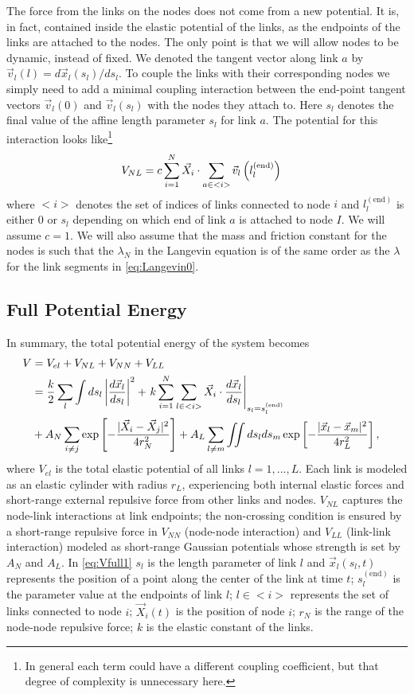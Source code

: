 \documentclass[endfloats,nofootinbib,preprint,floatfix,titlepage,superscriptaddress,linenumbers]{revtex4-1} %
\begin{document}
The force from the links on the nodes does  not come from a new potential. 
It is, in fact, contained inside the elastic potential of the links, %
as the endpoints of the links are attached to the nodes. The only point is that we will allow nodes to be dynamic, instead of fixed. We denoted the tangent vector along link $a$ by $\vec{v}_l(l) = d\vec{x}_l(s_l)/ds_l $. To couple the links with their corresponding nodes we simply need to add a minimal coupling interaction between the end-point tangent vectors $\vec{v}_l (0)$ and $\vec{v}_l (s_l)$ with the nodes they attach to. Here $s_l$ denotes the final value of the affine length parameter $s_l$ for link $a$. The potential for this interaction looks like\footnote{In general each term could have a different coupling coefficient, but that degree of complexity is unnecessary here.}
\begin{align}
   V_{NL} & =c\sum_{i=1}^N \vec{X}_i \cdot \sum_{a\in <i>}  \vec{v}_l\left(l^{(\mathrm{end})}_l\right)
\end{align}
where $<i>$ denotes the set of indices of links connected to node $i$ and $l^{(\mathrm{end})}_l$ is either $0$ or $s_l$ depending on which end of link $a$ is attached to node $I$. We will assume $c =1$. We will also assume that the mass and friction constant for the nodes is such that the $\lambda_N$ in the Langevin equation is of the same order as the $\lambda$ for the link segments in \eqref{eq:Langevin0}. 

\subsection{Full Potential Energy}
In summary, the total potential energy of the system becomes
\begin{align}
    V &= V_{el} + V_{NL} +V_{NN} + V_{LL} \cr 
    &= {k\over 2}\sum_l\int ds_l \left|{d\vec{x}_l\over ds_l} \right|^2 + 
    \left. k\sum_{i=1}^N  \sum_{l\in <i>}  \vec{X}_i \cdot{d\vec{x}_l%
    \over ds_l}\right|_{s_l = s_l^{(\mathrm{end})}}
    \cr
    &+ A_N\sum_{i\ne j}  \exp\left[- {|\vec{X}_i-\vec{X}_j|^2 \over 4r_N^2}\right]+A_L\sum_{l\ne m} \iint ds_lds_m 
    \exp\left[- {|\vec{x}_l-\vec{x}_m|^2 \over 4 r_L^2}\right] ,
 \label{eq:Vfull1}
\end{align}
where $V_{el}$ is the total elastic potential of all links $l=1,...,L$. 
Each link is modeled as an elastic cylinder with radius $r_L$, experiencing both internal elastic forces and short-range external repulsive force from other links and nodes. $V_{NL}$ captures the node-link interactions at link endpoints;
the non-crossing condition is ensured by a short-range repulsive force in
$V_{NN}$  (node-node interaction)  and  $V_{LL}$ (link-link interaction) modeled as short-range Gaussian potentials whose strength is set by $A_N$ and $A_L$. 
In \eqref{eq:Vfull1} $s_l$ is the length parameter of link $l$ and  $\vec{x}_l(s_l,t)$ represents the position of a point along the center of the link at time $t$;
$s_l^\mathrm{(end)}$ is the parameter value at the endpoints of link $l$;
$l\in <i>$ represents the set of links connected to node $i$; 
$\vec{X}_i(t)$ is the position of node $i$; $r_N$ is the range of the node-node repulsive force; $k$ is the elastic constant of the links.
\end{document}

